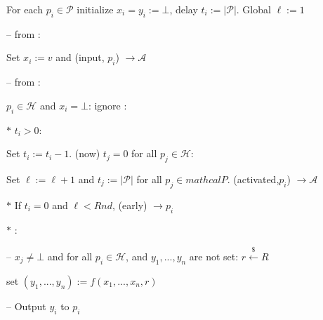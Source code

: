 \begin{bbox}[title={$\F_{\msf{sfe}}^{f,Rnd} (\mathcal{P})$}]

For each $p_i \in \mathcal{P}$ initialize $x_i = y_i := \bot$, delay $t_i := |\mathcal{P}|$.
Global $\ell := 1$

-- \OnInput {} from \Partyi:

	\qquad Set $x_i := v$ and \Send (input, $p_i$) $\rightarrow \mathcal{A}$

-- \OnInput {} from \Partyi:

	\qquad \If $p_i \in \mathcal{H}$ and $x_i = \bot$: ignore \Else:

		\qqquad $*$ \If $t_i > 0$:

			\qqqquad Set $t_i := t_i - 1$. \If (now) $t_j = 0$ for all $p_j \in \mathcal{H}$:

				\qqqqquad Set $\ell := \ell + 1$ and $t_j := |\mathcal{P}|$ for all $p_j \in mathcal{P}$. \Send (activated,$p_i$) $\rightarrow \mathcal{A}$

		\qqquad $*$ \Else If $t_i = 0$ and $\ell < Rnd$, \Send (early) $\rightarrow p_i$

		\qqquad $*$ \Else:

			\qqqquad -- \If $x_j \neq \bot$ and for all $p_i \in \mathcal{H}$, and $y_1,...,y_n$ are not set: $r \xleftarrow{\$} R$ 
			
				\qqqqquad set $(y_1,...,y_n) := f(x_1,...,x_n, r)$

			\qqqquad -- Output $y_i$ to $p_i$

\end{bbox}
